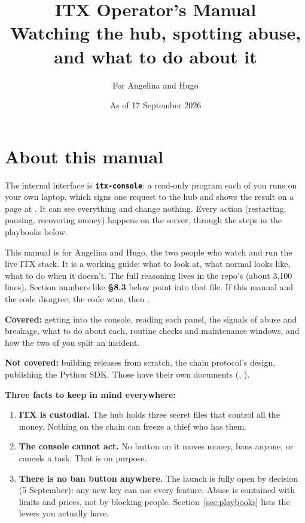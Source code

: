 \documentclass[11pt]{article}
\title{ITX Operator's Manual\\[4pt]\large Watching the hub, spotting abuse, and what to do about it}
\author{For Angelina and Hugo}
\date{As of 17 September 2026}
\begin{document}
\sloppy
\maketitle
\tableofcontents
\newpage

\section{About this manual}

The internal interface is \textbf{\texttt{itx-console}}: a read-only program each of you runs on your own laptop, which signs one request to the hub and shows the result on a page at . It can see everything and change nothing. Every action (restarting, pausing, recovering money) happens on the server, through the steps in the playbooks below.

This manual is for Angelina and Hugo, the two people who watch and run the live ITX stack. It is a working guide: what to look at, what normal looks like, what to do when it doesn't. The full reasoning lives in the repo's  (about 3,100 lines). Section numbers like \textbf{\S8.3} below point into that file. If this manual and the code disagree, the code wins, then .

\textbf{Covered:} getting into the console, reading each panel, the signals of abuse and breakage, what to do about each, routine checks and maintenance windows, and how the two of you split an incident.

\textbf{Not covered:} building releases from scratch, the chain protocol's design, publishing the Python SDK. Those have their own documents (, ).

\textbf{Three facts to keep in mind everywhere:}
\begin{enumerate}[leftmargin=1.5em]
  \item \textbf{ITX is custodial.} The hub holds three secret files that control all the money. Nothing on the chain can freeze a thief who has them.
  \item \textbf{The console cannot act.} No button on it moves money, bans anyone, or cancels a task. That is on purpose.
  \item \textbf{There is no ban button anywhere.} The launch is fully open by decision (5 September): any new key can use every feature. Abuse is contained with limits and prices, not by blocking people. Section~\ref{sec:playbooks} lists the levers you actually have.
\end{enumerate}
\end{document}
